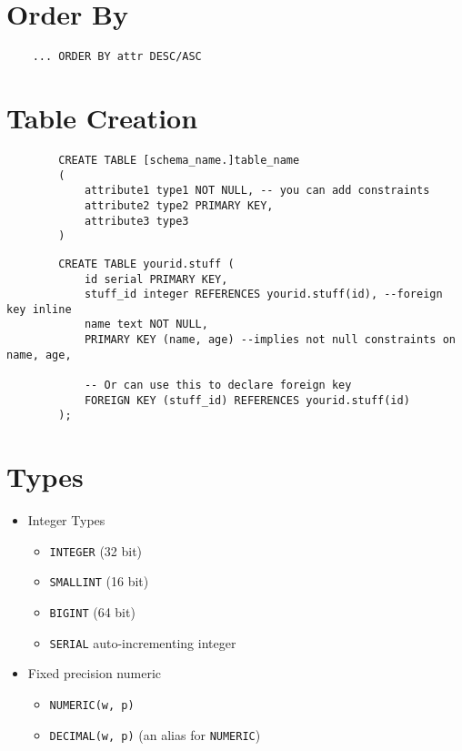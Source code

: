 \documentclass{../cheatsheet}
\begin{document}
\begin{multicols*}{2}
    \section{Order By}
    \begin{verbatim}
    ... ORDER BY attr DESC/ASC
    \end{verbatim}

    \section{Table Creation}
    \begin{verbatim}
        CREATE TABLE [schema_name.]table_name
        (
            attribute1 type1 NOT NULL, -- you can add constraints
            attribute2 type2 PRIMARY KEY,
            attribute3 type3
        )
    \end{verbatim}
    \begin{verbatim}
        CREATE TABLE yourid.stuff (
            id serial PRIMARY KEY,
            stuff_id integer REFERENCES yourid.stuff(id), --foreign key inline
            name text NOT NULL,
            PRIMARY KEY (name, age) --implies not null constraints on name, age,

            -- Or can use this to declare foreign key
            FOREIGN KEY (stuff_id) REFERENCES yourid.stuff(id)
        );
    \end{verbatim}

    \section{Types}
    \begin{itemize}
        \item Integer Types
            \begin{itemize}
                \item \texttt{INTEGER} (32 bit)
                \item \texttt{SMALLINT} (16 bit)
                \item \texttt{BIGINT} (64 bit)
                \item \texttt{SERIAL} auto-incrementing integer
            \end{itemize}

        \item Fixed precision numeric
            \begin{itemize}
                \item \texttt{NUMERIC(w, p)}
                \item \texttt{DECIMAL(w, p)} (an alias for \texttt{NUMERIC})
            \end{itemize}


\end{itemize}
\end{multicols*}
\end{document}
